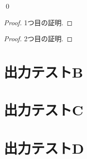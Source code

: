 \documentclass[uplatex, dvipdfmx, a4paper, 12pt, class=jsbook, crop=false]{standalone}
\begin{document}
\begin{definition}[テスト定義B]
	\label{def:test-def-B}
	\lipsum[1][2]
\end{definition}

\begin{theorem}[テスト定理A]
	\label{thm:test-thm-A}
	\lipsum[1][2]
\end{theorem}

\begin{corollary}
	\label{cor:test-corollary-A}
	\lipsum[1][2]
	\qed
\end{corollary}

\begin{corollary}
	\label{cor:test-corollary-B}
	\lipsum[1][2]
\end{corollary}

\begin{proposition}
	\label{prop:test-prop-A}
	\lipsum[1][2]
\end{proposition}

\begin{proof}
	\label{pf:test-proof-A}
	1つ目の証明.
\end{proof}

\begin{proof}
	\label{pf:test-proof-B}
	2つ目の証明.
\end{proof}

\begin{problem}
	\label{prob:test-problem-A}
	\lipsum[1][2]
\end{problem}

\section{出力テストB}
\label{sec:test-B}
\lipsum[2-3]

\section{出力テストC}
\label{sec:test-C}
\lipsum[4][1]

\section{出力テストD}
\label{sec:test-D}
\lipsum[4][1-3]
\end{document}
